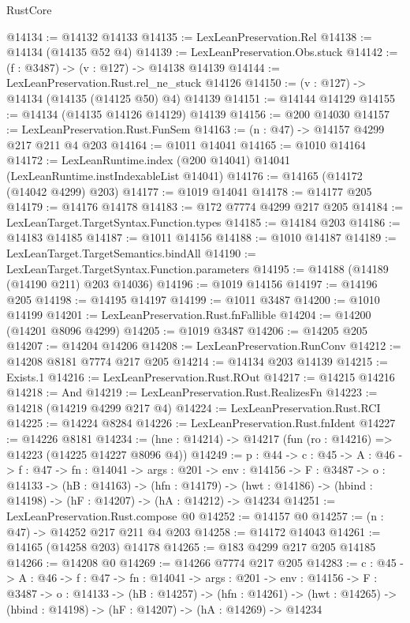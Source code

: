 \begin{lexlean}{RustCore}
\begin{coremodule}
@14134 := @14132 @14133
@14135 := LexLeanPreservation.Rel
@14138 := @14134 (@14135 @52 @4)
@14139 := LexLeanPreservation.Obs.stuck
@14142 := (f : @3487) -> (v : @127) -> @14138 @14139
@14144 := LexLeanPreservation.Rust.rel_ne_stuck @14126
@14150 := (v : @127) -> @14134 (@14135 (@14125 @50) @4) @14139
@14151 := @14144 @14129
@14155 := @14134 (@14135 @14126 @14129) @14139
@14156 := @200 @14030
@14157 := LexLeanPreservation.Rust.FunSem
@14163 := (n : @47) -> @14157 @4299 @217 @211 @4 @203
@14164 := @1011 @14041
@14165 := @1010 @14164
@14172 := LexLeanRuntime.index (@200 @14041) @14041 (LexLeanRuntime.instIndexableList @14041)
@14176 := @14165 (@14172 (@14042 @4299) @203)
@14177 := @1019 @14041
@14178 := @14177 @205
@14179 := @14176 @14178
@14183 := @172 @7774 @4299 @217 @205
@14184 := LexLeanTarget.TargetSyntax.Function.types
@14185 := @14184 @203
@14186 := @14183 @14185
@14187 := @1011 @14156
@14188 := @1010 @14187
@14189 := LexLeanTarget.TargetSemantics.bindAll
@14190 := LexLeanTarget.TargetSyntax.Function.parameters
@14195 := @14188 (@14189 (@14190 @211) @203 @14036)
@14196 := @1019 @14156
@14197 := @14196 @205
@14198 := @14195 @14197
@14199 := @1011 @3487
@14200 := @1010 @14199
@14201 := LexLeanPreservation.Rust.fnFallible
@14204 := @14200 (@14201 @8096 @4299)
@14205 := @1019 @3487
@14206 := @14205 @205
@14207 := @14204 @14206
@14208 := LexLeanPreservation.RunConv
@14212 := @14208 @8181 @7774 @217 @205
@14214 := @14134 @203 @14139
@14215 := Exists.{1}
@14216 := LexLeanPreservation.Rust.ROut
@14217 := @14215 @14216
@14218 := And
@14219 := LexLeanPreservation.Rust.RealizesFn
@14223 := @14218 (@14219 @4299 @217 @4)
@14224 := LexLeanPreservation.Rust.RCI
@14225 := @14224 @8284
@14226 := LexLeanPreservation.Rust.fnIdent
@14227 := @14226 @8181
@14234 := (hne : @14214) -> @14217 (fun (ro : @14216) => @14223 (@14225 @14227 @8096 @4))
@14249 := {p : @44} ->
  {c : @45} ->
  {A : @46} ->
  {f : @47} ->
  {fn : @14041} ->
  {args : @201} ->
  {env : @14156} ->
  {F : @3487} ->
  {o : @14133} ->
  (hB : @14163) ->
  (hfn : @14179) -> (hwt : @14186) -> (hbind : @14198) -> (hF : @14207) -> (hA : @14212) -> @14234
@14251 := LexLeanPreservation.Rust.compose @0
@14252 := @14157 @0
@14257 := (n : @47) -> @14252 @217 @211 @4 @203
@14258 := @14172 @14043
@14261 := @14165 (@14258 @203) @14178
@14265 := @183 @4299 @217 @205 @14185
@14266 := @14208 @0
@14269 := @14266 @7774 @217 @205
@14283 := {c : @45} ->
  {A : @46} ->
  {f : @47} ->
  {fn : @14041} ->
  {args : @201} ->
  {env : @14156} ->
  {F : @3487} ->
  {o : @14133} ->
  (hB : @14257) ->
  (hfn : @14261) -> (hwt : @14265) -> (hbind : @14198) -> (hF : @14207) -> (hA : @14269) -> @14234

\end{coremodule}
\end{lexlean}
